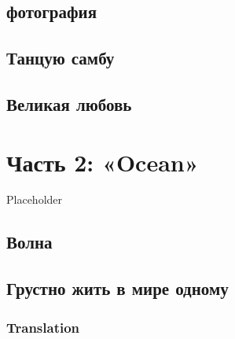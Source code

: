 \documentclass[
]{article}
\begin{document}
\hypertarget{ux444ux43eux442ux43eux433ux440ux430ux444ux438ux44f}{%
\subsection*{фотография}\label{ux444ux43eux442ux43eux433ux440ux430ux444ux438ux44f}}

\hypertarget{ux442ux430ux43dux446ux443ux44e-ux441ux430ux43cux431ux443}{%
\subsection*{Танцую самбу}\label{ux442ux430ux43dux446ux443ux44e-ux441ux430ux43cux431ux443}}

\hypertarget{ux432ux435ux43bux438ux43aux430ux44f-ux43bux44eux431ux43eux432ux44c}{%
\subsection*{Великая любовь}\label{ux432ux435ux43bux438ux43aux430ux44f-ux43bux44eux431ux43eux432ux44c}}

\hypertarget{ux447ux430ux441ux442ux44c-2-ocean}{%
\section*{Часть 2: «Ocean»}\label{ux447ux430ux441ux442ux44c-2-ocean}}

Placeholder

\hypertarget{ux432ux43eux43bux43dux430}{%
\subsection*{Волна}\label{ux432ux43eux43bux43dux430}}

\hypertarget{ux433ux440ux443ux441ux442ux43dux43e-ux436ux438ux442ux44c-ux432-ux43cux438ux440ux435-ux43eux434ux43dux43eux43cux443}{%
\subsection*{Грустно жить в мире одному}\label{ux433ux440ux443ux441ux442ux43dux43e-ux436ux438ux442ux44c-ux432-ux43cux438ux440ux435-ux43eux434ux43dux43eux43cux443}}

\hypertarget{translation}{%
\subsubsection{Translation}\label{translation}}
\end{document}
